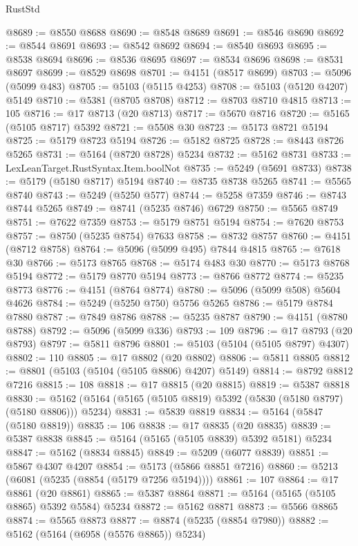 \begin{lexlean}{RustStd}
\begin{coremodule}
@8689 := @8550 @8688
@8690 := @8548 @8689
@8691 := @8546 @8690
@8692 := @8544 @8691
@8693 := @8542 @8692
@8694 := @8540 @8693
@8695 := @8538 @8694
@8696 := @8536 @8695
@8697 := @8534 @8696
@8698 := @8531 @8697
@8699 := @8529 @8698
@8701 := @4151 (@8517 @8699)
@8703 := @5096 (@5099 @483)
@8705 := @5103 (@5115 @4253)
@8708 := @5103 (@5120 @4207) @5149
@8710 := @5381 (@8705 @8708)
@8712 := @8703 @8710 @4815
@8713 := 105
@8716 := @17 @8713 (@20 @8713)
@8717 := @5670 @8716
@8720 := @5165 (@5105 @8717) @5392
@8721 := @5508 @30
@8723 := @5173 @8721 @5194
@8725 := @5179 @8723 @5194
@8726 := @5182 @8725
@8728 := @8443 @8726 @5265
@8731 := @5164 (@8720 @8728) @5234
@8732 := @5162 @8731
@8733 := LexLeanTarget.RustSyntax.Item.boolNot
@8735 := @5249 (@5691 @8733)
@8738 := @5179 (@5180 @8717) @5194
@8740 := @8735 @8738 @5265
@8741 := @5565 @8740
@8743 := @5249 (@5250 @577)
@8744 := @5258 @7359
@8746 := @8743 @8744 @5265
@8749 := @8741 (@5235 @8746) @6729
@8750 := @5565 @8749
@8751 := @7622 @7359
@8753 := @5179 @8751 @5194
@8754 := @7620 @8753
@8757 := @8750 (@5235 @8754) @7633
@8758 := @8732 @8757
@8760 := @4151 (@8712 @8758)
@8764 := @5096 (@5099 @495) @7844 @4815
@8765 := @7618 @30
@8766 := @5173 @8765
@8768 := @5174 @483 @30
@8770 := @5173 @8768 @5194
@8772 := @5179 @8770 @5194
@8773 := @8766 @8772
@8774 := @5235 @8773
@8776 := @4151 (@8764 @8774)
@8780 := @5096 (@5099 @508) @5604 @4626
@8784 := @5249 (@5250 @750) @5756 @5265
@8786 := @5179 @8784 @7880
@8787 := @7849 @8786
@8788 := @5235 @8787
@8790 := @4151 (@8780 @8788)
@8792 := @5096 (@5099 @336)
@8793 := 109
@8796 := @17 @8793 (@20 @8793)
@8797 := @5811 @8796
@8801 := @5103 (@5104 (@5105 @8797) @4307)
@8802 := 110
@8805 := @17 @8802 (@20 @8802)
@8806 := @5811 @8805
@8812 := @8801 (@5103 (@5104 (@5105 @8806) @4207) @5149)
@8814 := @8792 @8812 @7216
@8815 := 108
@8818 := @17 @8815 (@20 @8815)
@8819 := @5387 @8818
@8830 := @5162 (@5164 (@5165 (@5105 @8819) @5392 (@5830 (@5180 @8797) (@5180 @8806))) @5234)
@8831 := @5839 @8819
@8834 := @5164 (@5847 (@5180 @8819))
@8835 := 106
@8838 := @17 @8835 (@20 @8835)
@8839 := @5387 @8838
@8845 := @5164 (@5165 (@5105 @8839) @5392 @5181) @5234
@8847 := @5162 (@8834 @8845)
@8849 := @5209 (@6077 @8839)
@8851 := @5867 @4307 @4207
@8854 := @5173 (@5866 @8851 @7216)
@8860 := @5213 (@6081 (@5235 (@8854 (@5179 @7256 @5194))))
@8861 := 107
@8864 := @17 @8861 (@20 @8861)
@8865 := @5387 @8864
@8871 := @5164 (@5165 (@5105 @8865) @5392 @5584) @5234
@8872 := @5162 @8871
@8873 := @5566 @8865
@8874 := @5565 @8873
@8877 := @8874 (@5235 (@8854 @7980))
@8882 := @5162 (@5164 (@6958 (@5576 @8865)) @5234)

\end{coremodule}
\end{lexlean}
